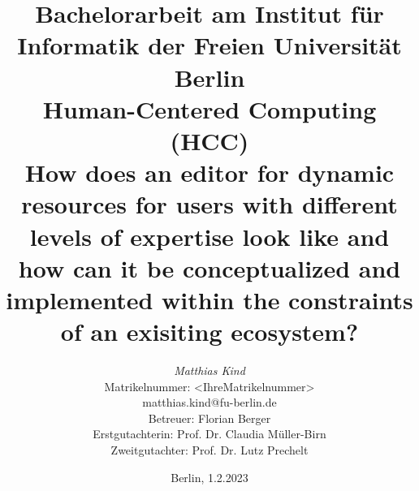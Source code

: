 %
\pagestyle{empty}

\begin{titlepage}

\title{
{\small Bachelorarbeit am Institut für Informatik der Freien Universität Berlin}\\
{\small Human-Centered Computing (HCC)}\\
[6ex]
{\LARGE How does an editor for dynamic resources for users with different levels of expertise look like and how can it be conceptualized and implemented within the constraints of an exisiting ecosystem?}}


\author{
{\emph{\normalsize{Matthias Kind}}}\\
{\normalsize Matrikelnummer: <IhreMatrikelnummer>}\\
{\normalsize matthias.kind@fu-berlin.de}\\ 
[18ex]   
{\normalsize Betreuer: Florian Berger} \\
{\normalsize Erstgutachterin: Prof. Dr. Claudia Müller-Birn} \\
{\normalsize Zweitgutachter: Prof. Dr. Lutz Prechelt}}
\vspace{6ex}
\date{\normalsize Berlin, 1.2.2023}
\maketitle
\end{titlepage}

